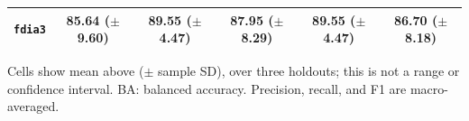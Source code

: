 \documentclass[letterpaper,journal]{IEEEtran}
\begin{document}
\begin{table}[p]
\begin{adjustbox}{max width=\textwidth,max totalheight=0.87\textheight}
\begin{minipage}{\textwidth}
\begin{minipage}[t]{0.48\textwidth}
\begin{tabular}{@{}lccccc@{}}
\texttt{fdia3} & \shortstack{85.64\\($\pm$9.60)} & \shortstack{89.55\\($\pm$4.47)} & \shortstack{87.95\\($\pm$8.29)} & \shortstack{89.55\\($\pm$4.47)} & \shortstack{86.70\\($\pm$8.18)} \\
\hline\end{tabular}
\par\smallskip\begin{minipage}{\columnwidth}\scriptsize Cells show mean above ($\pm$ sample SD), over three holdouts; this is not a range or confidence interval. BA: balanced accuracy. Precision, recall, and F1 are macro-averaged.\end{minipage}

\end{minipage}
\end{minipage}
\end{adjustbox}
\end{table}
\end{document}
